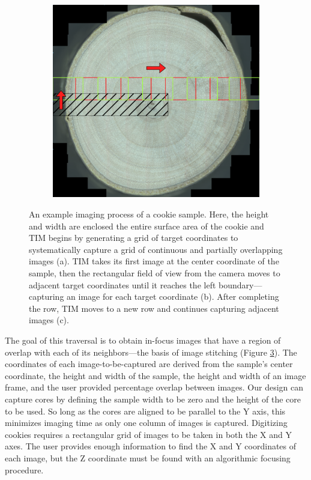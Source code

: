 \documentclass[a4paper,12pt]{article}
\begin{document}
\begin{figure}
\begin{subfigure}{.3\textwidth}
      \caption{}
      \label{SUBFIGURE LABEL 2}
  \end{subfigure}
  \begin{subfigure}{.3\textwidth}
      \centering
      \includegraphics[width=.95\linewidth]{../content/cookie_figure_second_row.png}  
      \caption{}
      \label{SUBFIGURE LABEL 3}
  \end{subfigure} %
  \caption{An example imaging process of a cookie sample. Here, the height and width are enclosed the entire surface area of the cookie and TIM begins by generating a grid of target coordinates to systematically capture a grid of continuous and partially overlapping images (a). TIM takes its first image at the center coordinate of the sample, then the rectangular field of view from the camera moves to adjacent target coordinates until it reaches the left boundary---capturing an image for each target coordinate (b). After completing the row, TIM moves to a new row and continues capturing adjacent images (c). }
  \label{FIGURE LABEL}
  \end{figure}

The goal of this traversal is to obtain in-focus images that have a region of overlap with each of its neighbors---the basis of image stitching (Figure \ref{FIGURE LABEL}). 
The coordinates of each image-to-be-captured are derived from the sample's center coordinate, the height and width of the sample, the height and width of an image frame, and the user provided percentage overlap between images.  
Our design can capture cores by defining the sample width to be zero and the height of the core to be used. So long as the cores are aligned to be parallel to the Y axis, this minimizes imaging time as only one column of images is captured.
Digitizing cookies requires a rectangular grid of images to be taken in both the X and Y axes. 
The user provides enough information to find the X and Y coordinates of each image, but the Z coordinate must be found with an algorithmic focusing procedure. 
\end{document}
